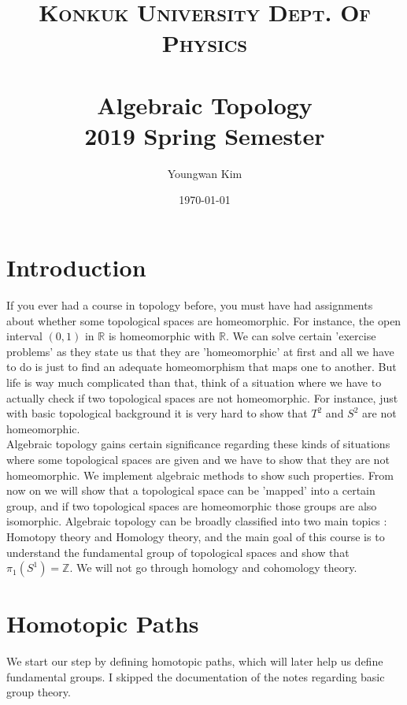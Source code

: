 \documentclass[paper=a4, fontsize=11pt]{scrartcl}
\title{	
	\normalfont \normalsize 
	\textsc{Konkuk University Dept. Of Physics} \\ [25pt] %
	\horrule{1pt} \\[0.4cm] 
	\huge Algebraic Topology \\
	\vspace{0.1in}
	\Large 2019 Spring Semester
	\horrule{1pt} \\[0.4cm] 
}
\author{Youngwan Kim}
\date{\normalsize\today}
\begin{document}
	
\maketitle	

\section{Introduction}

\vspace{0.15in}

If you ever had a course in topology before, you must have had assignments about whether some topological spaces are homeomorphic. For instance, the open interval $(0,1)$ in $\mathbb{R}$ is homeomorphic with $\mathbb{R}$. We can solve certain 'exercise problems' as they state us that they are 'homeomorphic' at first and all we have to do is just to find an adequate homeomorphism that maps one to another. But life is way much complicated than that, think of a situation where we have to actually check if two topological spaces are not homeomorphic. For instance, just with basic topological background it is very hard to show that $T^2$ and $S^2$ are not homeomorphic. \\

Algebraic topology gains certain significance regarding these kinds of situations where some topological spaces are given and we have to show that they are not homeomorphic. We implement algebraic methods to show such properties. From now on we will show that a topological space can be 'mapped' into a certain group, and if two topological spaces are homeomorphic those groups are also isomorphic. Algebraic topology can be broadly classified into two main topics : Homotopy theory and Homology theory, and the main goal of this course is to understand the fundamental group of topological spaces and show that $\pi_1 (S^1) = \mathbb{Z}$. We will not go through homology and cohomology theory.\\

\section{Homotopic Paths}

\vspace{0.15in}

We start our step by defining homotopic paths, which will later help us define fundamental groups. I skipped the documentation of the notes regarding basic group theory.\\
\end{document}
